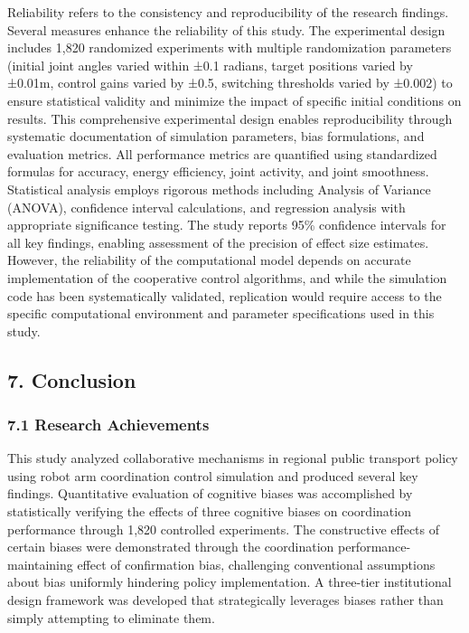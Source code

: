 Reliability refers to the consistency and reproducibility of the
research findings. Several measures enhance the reliability of this
study. The experimental design includes 1,820 randomized experiments
with multiple randomization parameters (initial joint angles varied
within ±0.1 radians, target positions varied by ±0.01m, control gains
varied by ±0.5, switching thresholds varied by ±0.002) to ensure
statistical validity and minimize the impact of specific initial
conditions on results. This comprehensive experimental design enables
reproducibility through systematic documentation of simulation
parameters, bias formulations, and evaluation metrics. All performance
metrics are quantified using standardized formulas for accuracy, energy
efficiency, joint activity, and joint smoothness. Statistical analysis
employs rigorous methods including Analysis of Variance (ANOVA),
confidence interval calculations, and regression analysis with
appropriate significance testing. The study reports 95\% confidence
intervals for all key findings, enabling assessment of the precision of
effect size estimates. However, the reliability of the computational
model depends on accurate implementation of the cooperative control
algorithms, and while the simulation code has been systematically
validated, replication would require access to the specific
computational environment and parameter specifications used in this
study.

\subsection{7. Conclusion}\label{conclusion}

\subsubsection{7.1 Research Achievements}\label{research-achievements}

This study analyzed collaborative mechanisms in regional public
transport policy using robot arm coordination control simulation and
produced several key findings. Quantitative evaluation of cognitive
biases was accomplished by statistically verifying the effects of three
cognitive biases on coordination performance through 1,820 controlled
experiments. The constructive effects of certain biases were
demonstrated through the coordination performance-maintaining effect of
confirmation bias, challenging conventional assumptions about bias
uniformly hindering policy implementation. A three-tier institutional
design framework was developed that strategically leverages biases
rather than simply attempting to eliminate them.

